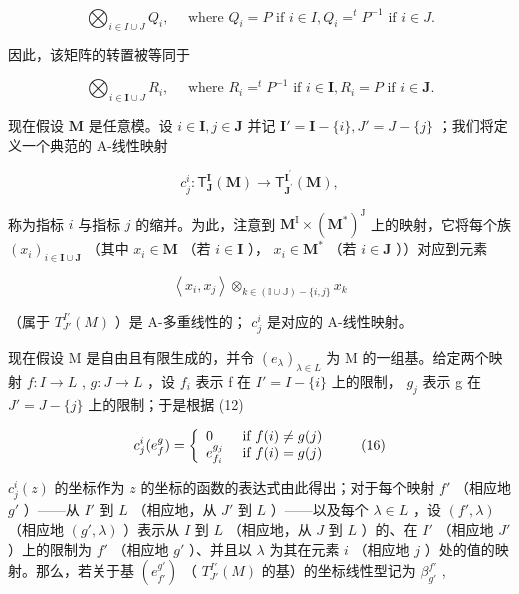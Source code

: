 \[
\bigotimes_ {i \in I \cup J} Q _ {i}, \quad \text { where } Q _ {i} = P \text { if } i \in I, Q _ {i} = ^ {t} P ^ {- 1} \text { if } i \in J.\tag{13}
\]

因此，该矩阵的转置被等同于

\[
\bigotimes_ {i \in \mathbf {I} \cup J} R _ {i}, \quad \text { where } R _ {i} = ^ {t} P ^ {- 1} \text { if } i \in \mathbf {I}, R _ {i} = P \text { if } i \in \mathbf {J}.\tag{14}
\]

现在假设 \(\mathbf{M}\) 是任意模。设 \(i\in \mathbf{I}, j\in \mathbf{J}\) 并记 \(\mathbf{I}' = \mathbf{I} - \{i\}, J' = J - \{j\}\) ；我们将定义一个典范的 A-线性映射

\[
c _ {j} ^ {i} \colon \mathsf {T} _ {\mathbf {J}} ^ {\mathbf {I}} (\mathbf {M}) \to \mathsf {T} _ {\mathbf {J} ^ {\prime}} ^ {\mathbf {I} ^ {\prime}} (\mathbf {M}),
\]

称为指标 \(i\) 与指标 \(j\) 的缩并。为此，注意到 \(\mathbf{M}^{\mathrm{I}} \times (\mathbf{M}^{*})^{\mathrm{J}}\) 上的映射，它将每个族 \((x_{i})_{i \in \mathbf{I} \cup \mathbf{J}}\) （其中 \(x_{i} \in \mathbf{M}\) （若 \(i \in \mathbf{I}\) ）， \(x_{i} \in \mathbf{M}^{*}\) （若 \(i \in \mathbf{J}\) ））对应到元素

\[
\left\langle x _ {i}, x _ {j} \right\rangle \otimes_ {k \in (\mathbb {I} \cup \mathbb {J}) - \{i, j \}} x _ {k}\tag{15}
\]

（属于 \(T_{J'}^{I'}(M)\) ）是 A-多重线性的； \(c_{j}^{i}\) 是对应的 A-线性映射。

现在假设 M 是自由且有限生成的，并令 \((e_{\lambda})_{\lambda \in L}\) 为 M 的一组基。给定两个映射 \(f: I \to L\) , \(g: J \to L\) ，设 \(f_i\) 表示 f 在 \(I' = I - \{i\}\) 上的限制， \(g_j\) 表示 g 在 \(J' = J - \{j\}\) 上的限制；于是根据 (12)

\[
c _ {j} ^ {i} (e _ {f} ^ {g}) = \left\{ \begin{array}{l l} 0 & \text { if } f (i) \neq g (j) \\ e _ {f _ {i}} ^ {g _ {j}} & \text { if } f (i) = g (j) \end{array} \right.\tag{16}
\]

\(c_j^i(z)\) 的坐标作为 \(z\) 的坐标的函数的表达式由此得出；对于每个映射 \(f'\) （相应地 \(g'\) ）——从 \(I'\) 到 \(L\) （相应地，从 \(J'\) 到 \(L\) ）——以及每个 \(\lambda \in L\) ，设 \((f', \lambda)\) （相应地 \((g', \lambda)\) ）表示从 \(I\) 到 \(L\) （相应地，从 \(J\) 到 \(L\) ）的、在 \(I'\) （相应地 \(J'\) ）上的限制为 \(f'\) （相应地 \(g'\) ）、并且以 \(\lambda\) 为其在元素 \(i\) （相应地 \(j\) ）处的值的映射。那么，若关于基 \((e_{f'}^{g'})\) （ \(T_{J'}^{I'}(M)\) 的基）的坐标线性型记为 \(\beta_{g'}^{f'}\) ,

